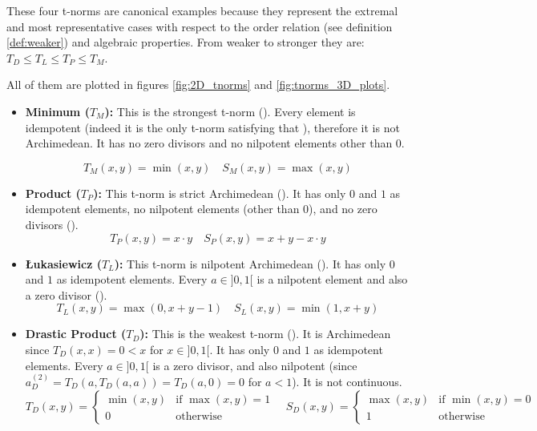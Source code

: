   \begin{example}\label{ex:basic_tnorms}
    These four t-norms are canonical examples because they represent the extremal and most representative cases with respect to the order relation (see definition \ref{def:weaker}) and algebraic properties. From weaker to stronger they are: $T_D \leq T_L \leq T_P \leq T_M$. 
    
    All of them are plotted in figures \ref{fig:2D_tnorms} and \ref{fig:tnorms_3D_plots}.
      \begin{itemize}
        \item \textbf{Minimum ($T_M$):} 
            This is the strongest t-norm (\cite[Rem.~1.5(i)]{Klement2000}). Every element is idempotent (indeed it is the only t-norm satisfying that \cite[Lem.~1.2.3]{FULLER2}), therefore it is not Archimedean. It has no zero divisors and no nilpotent elements other than 0.
    
        \[T_M(x, y) = \min(x, y) \quad S_M(x, y) = \max(x, y)
    \]
        \item \textbf{Product ($T_P$):} 
        This t-norm is strict Archimedean (\cite[Ex.~2.14(i)]{Klement2000}). It has only $0$ and $1$ as idempotent elements, no nilpotent elements (other than $0$), and no zero divisors (\cite[Ex.~2.2(i)]{Klement2000}).
        \[T_P(x, y) = x \cdot y \quad S_P(x, y) = x + y - x \cdot y\]
        \item \textbf{Łukasiewicz ($T_L$):} 
        This t-norm is nilpotent Archimedean (\cite[Ex.~2.14(i)]{Klement2000}). It has only $0$ and $1$ as idempotent elements. Every $a \in ]0,1[$ is a nilpotent element and also a zero divisor (\cite[Ex.~2.2(i)]{Klement2000}).
        \[T_L(x, y) = \max(0, x + y - 1) \quad S_L(x, y) = \min(1, x + y)\]
        \item \textbf{Drastic Product ($T_D$):} This is the weakest t-norm (\cite[Rem.~1.5(i)]{Klement2000}). It is Archimedean since $T_D(x,x)=0 < x$ for $x \in ]0,1[$. It has only $0$ and $1$ as idempotent elements. Every $a \in ]0,1[$ is a zero divisor, and also nilpotent (since $a_D^{(2)} = T_D(a, T_D(a,a)) = T_D(a,0) = 0$ for $a<1$). It is not continuous.
        \[T_D(x, y) = \begin{cases} \min(x,y) & \text{if } \max(x,y)=1 \\ 0 & \text{otherwise} \end{cases} \quad S_D(x, y) = \begin{cases} \max(x,y) & \text{if } \min(x,y)=0 \\ 1 & \text{otherwise} \end{cases}\]
      \end{itemize}
    \end{example}


